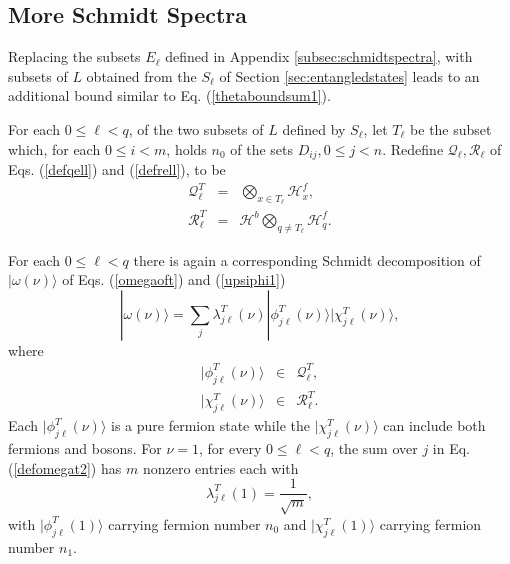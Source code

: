 \documentclass[twocolumn,amsmath,amssymb]{revtex4-1}
\begin{document}
\subsection{\label{subsec:schmidtspectra2} More Schmidt Spectra}

Replacing the subsets $E_\ell$ defined in Appendix \ref{subsec:schmidtspectra},
with subsets of $L$ obtained from the $S_\ell$ of Section \ref{sec:entangledstates} leads to an
additional bound similar to Eq. (\ref{thetaboundsum1}).

For each $0 \le \ell < q$, of the two subsets of $L$ defined by $S_\ell$, let $T_\ell$ be
the subset which, for each $0 \le i < m$, holds $n_0$ of the sets $D_{ij}, 0 \le j < n$.
Redefine $\mathcal{Q}_\ell, \mathcal{R}_\ell$ of Eqs. (\ref{defqell}) and (\ref{defrell}), to be
\begin{subequations}
\begin{eqnarray}
\label{defqell2}
\mathcal{Q}^T_\ell &=& \bigotimes_{x \in T_\ell} \mathcal{H}_x^f, \\
\label{defrell2}
\mathcal{R}^T_\ell &=& \mathcal{H}^b\bigotimes_{q \ne T_\ell} \mathcal{H}_q^f.
\end{eqnarray}
\end{subequations}

For each $0 \le \ell < q$ there is again a corresponding Schmidt
decomposition of $|\omega(\nu) \rangle $ of Eqs. (\ref{omegaoft}) and (\ref{upsiphi1})
\begin{equation}
\label{defomegat2}
|\omega(\nu) \rangle  =  \sum_j \lambda^T_{j\ell}(\nu) 
|\phi^T_{j\ell}(\nu) \rangle |\chi^T_{j\ell}(\nu) \rangle ,
\end{equation}
where 
\begin{subequations}
\begin{eqnarray}
\label{defphit1}
|\phi^T_{j\ell}(\nu) \rangle  & \in & \mathcal{Q}^T_\ell, \\
\label{defchit1}
|\chi^T_{j\ell}( \nu) \rangle  & \in & \mathcal{R}^T_\ell.
\end{eqnarray}
\end{subequations}
Each $|\phi^T_{j\ell}(\nu) \rangle $ is a pure fermion state while
the $|\chi^T_{j\ell}(\nu) \rangle $ can include both fermions and bosons.
For $\nu = 1$, for every $0 \le \ell < q$,  the sum over $j$ in Eq. (\ref{defomegat2})
has $m$ nonzero entries each with
\begin{equation}
  \label{lambda2}
  \lambda^T_{j \ell}(1) = \frac{1}{\sqrt{m}},
\end{equation}
with $|\phi^T_{j\ell}(1) \rangle $ carrying fermion number $n_0$ and 
$|\chi^T_{j\ell}(1) \rangle $ carrying fermion number $n_1$.
\end{document}
